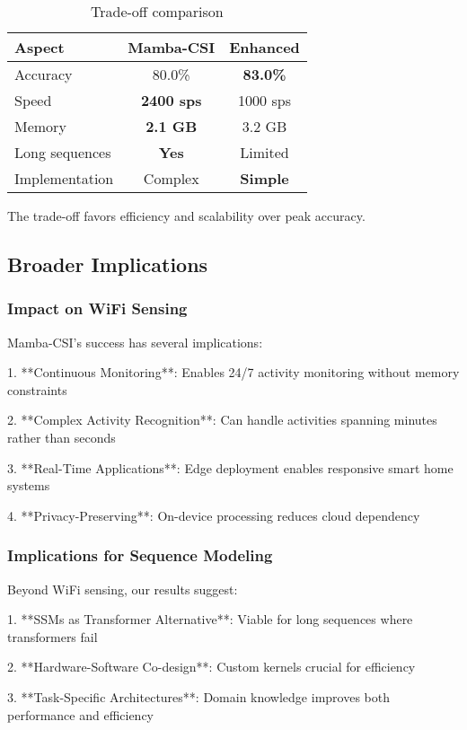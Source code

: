 \documentclass[10pt,journal,compsoc]{IEEEtran}
\begin{document}
\begin{table}[h]
\centering
\caption{Trade-off comparison}
\label{tab:tradeoffs}
\begin{tabular}{lcc}
\toprule
Aspect & Mamba-CSI & Enhanced \\
\midrule
Accuracy & 80.0\% & \textbf{83.0\%} \\
Speed & \textbf{2400 sps} & 1000 sps \\
Memory & \textbf{2.1 GB} & 3.2 GB \\
Long sequences & \textbf{Yes} & Limited \\
Implementation & Complex & \textbf{Simple} \\
\bottomrule
\end{tabular}
\end{table}

The trade-off favors efficiency and scalability over peak accuracy.

\subsection{Broader Implications}

\subsubsection{Impact on WiFi Sensing}

Mamba-CSI's success has several implications:

1. **Continuous Monitoring**: Enables 24/7 activity monitoring without memory constraints

2. **Complex Activity Recognition**: Can handle activities spanning minutes rather than seconds

3. **Real-Time Applications**: Edge deployment enables responsive smart home systems

4. **Privacy-Preserving**: On-device processing reduces cloud dependency

\subsubsection{Implications for Sequence Modeling}

Beyond WiFi sensing, our results suggest:

1. **SSMs as Transformer Alternative**: Viable for long sequences where transformers fail

2. **Hardware-Software Co-design**: Custom kernels crucial for efficiency

3. **Task-Specific Architectures**: Domain knowledge improves both performance and efficiency
\end{document}
